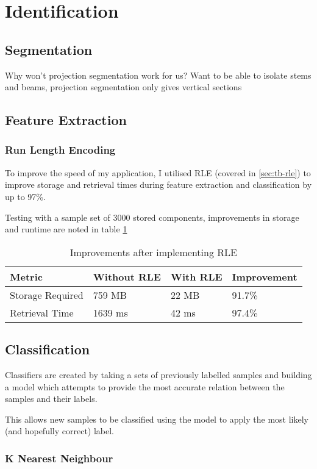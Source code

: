 \section{Identification}


\subsection{Segmentation}

Why won't projection segmentation work for us? Want to be able to isolate stems and beams, projection segmentation only gives vertical sections


\subsection{Feature Extraction}

\subsubsection{Run Length Encoding}
To improve the speed of my application, I utilised \acrfull{RLE} (covered in \cref{sec:tb-rle}) to improve storage and retrieval times during feature extraction and classification by up to 97\%.

Testing with a sample set of 3000 stored components, improvements in storage and runtime are noted in table \cref{table:rle-improvement}

\begin{table}[h]

    \begin{tabularx}{\textwidth}{ X X X X }
    \toprule
    Metric                  & Without RLE   & With RLE   & Improvement \\
    \midrule
    Storage Required        & 759 MB        & 22 MB      & 91.7\%      \\
    Retrieval Time          & 1639 ms       & 42 ms      & 97.4\% \\
    \bottomrule
    \end{tabularx}

    \label{table:rle-improvement}
    \caption{Improvements after implementing RLE}
\end{table}

\subsection{Classification}
\label{sec:implementation-classification}

Classifiers are created by taking a sets of previously labelled samples and building a model which attempts to provide the most accurate relation between the samples and their labels.

This allows new samples to be classified using the model to apply the most likely (and hopefully correct) label.

\subsubsection{K Nearest Neighbour}



